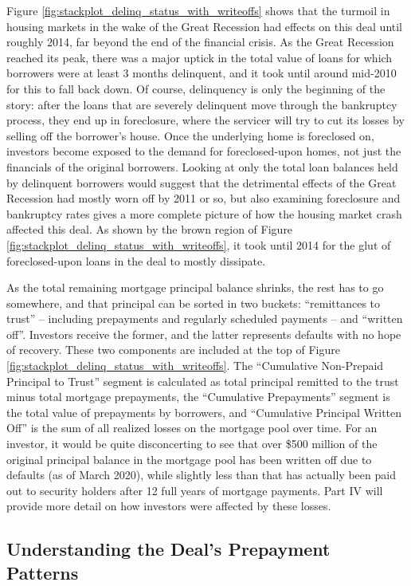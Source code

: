 \documentclass[12pt]{article}
\begin{document}
Figure \ref{fig:stackplot_delinq_status_with_writeoffs} shows that the turmoil in housing markets in the wake of the Great Recession had effects on this deal until roughly 2014, far beyond the end of the financial crisis. As the Great Recession reached its peak, there was a major uptick in the total value of loans for which borrowers were at least 3 months delinquent, and it took until around mid-2010 for this to fall back down. Of course, delinquency is only the beginning of the story: after the loans that are severely delinquent move through the bankruptcy process, they end up in foreclosure, where the servicer will try to cut its losses by selling off the borrower’s house. Once the underlying home is foreclosed on, investors become exposed to the demand for foreclosed-upon homes, not just the financials of the original borrowers. Looking at only the total loan balances held by delinquent borrowers would suggest that the detrimental effects of the Great Recession had mostly worn off by 2011 or so, but also examining foreclosure and bankruptcy rates gives a more complete picture of how the housing market crash affected this deal. As shown by the brown region of Figure \ref{fig:stackplot_delinq_status_with_writeoffs}, it took until 2014 for the glut of foreclosed-upon loans in the deal to mostly dissipate.

	As the total remaining mortgage principal balance shrinks, the rest has to go somewhere, and that principal can be sorted in two buckets: “remittances to trust” – including prepayments and regularly scheduled payments – and “written off”. Investors receive the former, and the latter represents defaults with no hope of recovery. These two components are included at the top of Figure \ref{fig:stackplot_delinq_status_with_writeoffs}. The “Cumulative Non-Prepaid Principal to Trust” segment is calculated as total principal remitted to the trust minus total mortgage prepayments, the “Cumulative Prepayments” segment is the total value of prepayments by borrowers, and “Cumulative Principal Written Off” is the sum of all realized losses on the mortgage pool over time. For an investor, it would be quite disconcerting to see that over \$500 million of the original principal balance in the mortgage pool has been written off due to defaults (as of March 2020), while slightly less than that has actually been paid out to security holders after 12 full years of mortgage payments. Part IV will provide more detail on how investors were affected by these losses.

\subsection*{Understanding the Deal's Prepayment Patterns}
\end{document}
